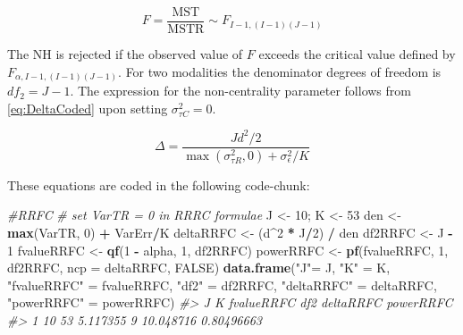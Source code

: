 \documentclass[
]{book}
\newenvironment{Shaded}{\begin{snugshade}}{\end{snugshade}}
\newcommand{\CommentTok}[1]{\textcolor[rgb]{0.56,0.35,0.01}{\textit{#1}}}
\newcommand{\DataTypeTok}[1]{\textcolor[rgb]{0.13,0.29,0.53}{#1}}
\newcommand{\DecValTok}[1]{\textcolor[rgb]{0.00,0.00,0.81}{#1}}
\newcommand{\KeywordTok}[1]{\textcolor[rgb]{0.13,0.29,0.53}{\textbf{#1}}}
\newcommand{\NormalTok}[1]{#1}
\newcommand{\OperatorTok}[1]{\textcolor[rgb]{0.81,0.36,0.00}{\textbf{#1}}}
\newcommand{\OtherTok}[1]{\textcolor[rgb]{0.56,0.35,0.01}{#1}}
\newcommand{\StringTok}[1]{\textcolor[rgb]{0.31,0.60,0.02}{#1}}
\begin{document}
\begin{equation}
F=\frac{\text{MST}}{\text{MSTR}} \sim F_{I-1,(I-1)(J-1)}
\label{eq:DefFStatFRRC-DBM2}
\end{equation}

The NH is rejected if the observed value of \(F\) exceeds the critical value defined by \(F_{\alpha, I-1,(I-1)(J-1)}\). For two modalities the denominator degrees of freedom is \(df_2 = J-1\). The expression for the non-centrality parameter follows from \eqref{eq:DeltaCoded} upon setting \(\sigma_{\tau C}^2 = 0\).

\begin{equation}
\Delta=\frac{Jd^2/2}{\max(\sigma_{\tau R}^2,0)+\sigma_{\epsilon}^2/K}
\label{eq:DefDeltaRRFC}
\end{equation}

These equations are coded in the following code-chunk:

\begin{Shaded}
\begin{Highlighting}[]
\CommentTok{\#RRFC}
\CommentTok{\# set VarTR = 0 in RRRC formulae}
\NormalTok{J \textless{}{-}}\StringTok{ }\DecValTok{10}\NormalTok{; K \textless{}{-}}\StringTok{ }\DecValTok{53}
\NormalTok{den \textless{}{-}}\StringTok{ }\KeywordTok{max}\NormalTok{(VarTR, }\DecValTok{0}\NormalTok{) }\OperatorTok{+}\StringTok{ }\NormalTok{VarErr}\OperatorTok{/}\NormalTok{K}
\NormalTok{deltaRRFC \textless{}{-}}\StringTok{ }\NormalTok{(d}\OperatorTok{\^{}}\DecValTok{2} \OperatorTok{*}\StringTok{ }\NormalTok{J}\OperatorTok{/}\DecValTok{2}\NormalTok{) }\OperatorTok{/}\StringTok{ }\NormalTok{den}
\NormalTok{df2RRFC \textless{}{-}}\StringTok{ }\NormalTok{J }\OperatorTok{{-}}\StringTok{ }\DecValTok{1}
\NormalTok{fvalueRRFC \textless{}{-}}\StringTok{ }\KeywordTok{qf}\NormalTok{(}\DecValTok{1} \OperatorTok{{-}}\StringTok{ }\NormalTok{alpha, }\DecValTok{1}\NormalTok{, df2RRFC)}
\NormalTok{powerRRFC \textless{}{-}}\StringTok{ }\KeywordTok{pf}\NormalTok{(fvalueRRFC, }\DecValTok{1}\NormalTok{, df2RRFC, }\DataTypeTok{ncp =}\NormalTok{ deltaRRFC, }\OtherTok{FALSE}\NormalTok{)}
\KeywordTok{data.frame}\NormalTok{(}\StringTok{"J"}\NormalTok{=}\StringTok{ }\NormalTok{J,  }\StringTok{"K"}\NormalTok{ =}\StringTok{ }\NormalTok{K, }\StringTok{"fvalueRRFC"}\NormalTok{ =}\StringTok{ }\NormalTok{fvalueRRFC, }\StringTok{"df2"}\NormalTok{ =}\StringTok{ }\NormalTok{df2RRFC, }\StringTok{"deltaRRFC"}\NormalTok{ =}\StringTok{ }\NormalTok{deltaRRFC, }\StringTok{"powerRRFC"}\NormalTok{ =}\StringTok{ }\NormalTok{powerRRFC)}
\CommentTok{\#\textgreater{}    J  K fvalueRRFC df2 deltaRRFC  powerRRFC}
\CommentTok{\#\textgreater{} 1 10 53   5.117355   9 10.048716 0.80496663}
\end{Highlighting}
\end{Shaded}
\end{document}
